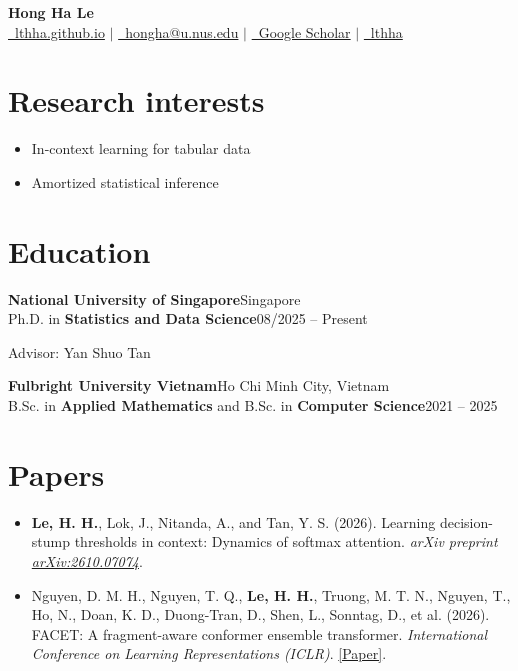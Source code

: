 \documentclass[11pt,a4paper]{article}
\newcommand{\entry}[4]{%
  \textbf{#1}\hfill #2\\
  #3\hfill #4\par
}
\newcommand{\entrygap}{\vspace{1.2ex}}
\newcommand{\me}[1]{\textbf{#1}}   %
\begin{document}
\begin{center}
  {\LARGE\bfseries Hong Ha Le}\\[0.8ex]
  \href{https://lthha.github.io}{\faGlobe\ lthha.github.io}
  \quad$|$\quad
  \href{mailto:hongha@u.nus.edu}{\faEnvelope\ hongha@u.nus.edu}
  \quad$|$\quad
  \href{https://scholar.google.com/citations?user=NXaNcBgAAAAJ&hl=en}{\faGraduationCap\ Google Scholar}
  \quad$|$\quad
  \href{https://github.com/lthha}{\faGithub\ lthha}
\end{center}
\vspace{-1ex}

\section{Research interests}
\begin{itemize}
  \item In-context learning for tabular data  %
  \item Amortized statistical inference
\end{itemize}

\section{Education}
\entry{National University of Singapore}{Singapore}
      {Ph.D. in \textbf{Statistics and Data Science}}{08/2025 -- Present}
Advisor: Yan Shuo Tan
\entrygap

\entry{Fulbright University Vietnam}{Ho Chi Minh City, Vietnam}
      {B.Sc. in \textbf{Applied Mathematics} and B.Sc. in \textbf{Computer Science}}{2021 -- 2025}

\section{Papers}
\begin{itemize}
  \item \me{Le, H. H.}, Lok, J., Nitanda, A., and Tan, Y. S. (2026).
        Learning decision-stump thresholds in context: Dynamics of softmax attention.
        \textit{arXiv preprint} \href{https://arxiv.org/abs/2610.07074}{\textit{arXiv:2610.07074}}.
  \item Nguyen, D. M. H., Nguyen, T. Q., \me{Le, H. H.}, Truong, M. T. N.,
        Nguyen, T., Ho, N., Doan, K. D., Duong-Tran, D., Shen, L., Sonntag, D.,
        et al. (2026). FACET: A fragment-aware conformer ensemble transformer.
        \textit{International Conference on Learning Representations (ICLR)}.
        \href{https://openreview.net/pdf?id=cpwbXHvd2h}{[Paper]}.
\end{itemize}
\end{document}
